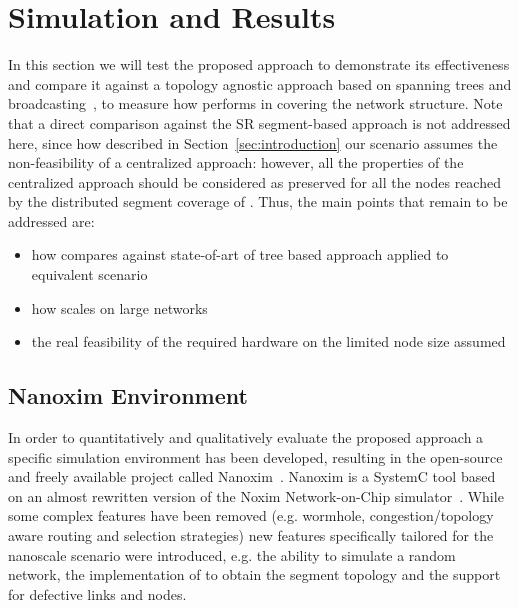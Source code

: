 
\section{Simulation and Results}
\label{sec:simulation}

In this section we will test the proposed \disr{} approach to
demonstrate its effectiveness and compare it against a topology
agnostic approach based on spanning trees and
broadcasting~\cite{Patwardhan05evaluatingthe}, to measure how \disr{}
performs in covering the network structure. Note that a direct
comparison against the SR segment-based approach is not addressed
here, since how described in Section~\ref{sec:introduction} our
scenario assumes the non-feasibility of a centralized approach:
however, all the properties of the centralized approach should be
considered as preserved for all the nodes reached by the distributed
segment coverage of \disr{}. Thus, the main points that remain to be
addressed are:
\begin{itemize}
\item how \disr{} compares against state-of-art of tree based approach
applied to equivalent scenario
\item how \disr{} scales on large networks
\item the real feasibility of the required hardware on the limited
node size assumed
\end{itemize}


\subsection{Nanoxim Environment}

In order to quantitatively and qualitatively evaluate the proposed approach a
specific simulation environment has been developed, resulting in
the open-source and freely available project called
Nanoxim~\cite{nanoxim}.
Nanoxim is a SystemC tool based on an almost rewritten
version of the Noxim Network-on-Chip simulator~\cite{noxim}. While some
complex features have been removed (e.g. wormhole, congestion/topology
aware routing and selection strategies) new features specifically
tailored for the nanoscale scenario were introduced, e.g. the ability to simulate a random
network, the implementation of \disr{} to obtain the segment topology
and the support for defective links and nodes.

